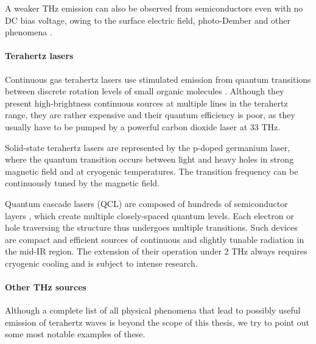A weaker THz emission can also be observed from semiconductors even with no DC bias voltage, owing to the surface electric field, photo-Dember and other phenomena \cite{corchia2001effects, heyman2001terahertz}.

\paragraph{Terahertz lasers}%
Continuous gas terahertz lasers use stimulated emission from quantum transitions between discrete rotation levels of small organic molecules \cite{chang1970cw}. Although they present high-brightness continuous sources at multiple lines in the terahertz range, they are rather expensive and their quantum efficiency is poor, as they usually have to be pumped by a powerful carbon dioxide laser at 33 THz.

Solid-state terahertz lasers are represented by the p-doped germanium laser, where the quantum transition occurs between light and heavy holes in strong magnetic field and at cryogenic temperatures. The transition frequency can be continuously tuned by the magnetic field.

Quantum cascade lasers (QCL) are composed of hundreds of semiconductor layers \cite{yin2012terahertz}, which create multiple closely-spaced quantum levels. Each electron or hole traversing the structure thus undergoes multiple transitions. Such devices are compact and  efficient sources of continuous and slightly tunable radiation in the mid-IR region. The extension of their operation under 2 THz always requires cryogenic cooling and is subject to intense research.
\paragraph{Other THz sources}%
Although a complete list of all physical phenomena that lead to possibly useful emission of terahertz waves is beyond the scope of this thesis, we try to point out some most notable examples of these. 

